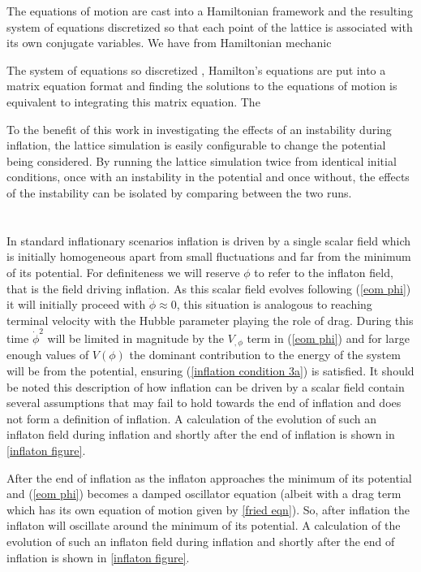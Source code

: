 \documentclass[letterpaper,11pt]{article}
\begin{document}
The equations of motion are cast into a Hamiltonian framework and the resulting system of equations discretized so that each point of the lattice is associated with its own conjugate variables. We have from Hamiltonian mechanic

The system of equations so discretized , Hamilton's equations are put into a matrix equation format and finding the solutions to the equations of motion is equivalent to integrating this matrix equation. The 

To the benefit of this work in investigating the effects of an instability during inflation, the lattice simulation is easily configurable to change the potential being considered. By running the lattice simulation twice from identical initial conditions, once with an instability in the potential and once without, the effects of the instability can be isolated by comparing between the two runs.

\section{}
In standard inflationary scenarios inflation is driven by a single scalar field which is initially homogeneous apart from small fluctuations and far from the minimum of its potential. %
For definiteness we will reserve $\phi$ to refer to the inflaton field, that is the field driving inflation.
As this scalar field evolves following (\ref{eom phi}) it will initially proceed with $\ddot{\phi} \approx 0$, this situation is analogous to reaching terminal velocity with the Hubble parameter playing the role of drag.%
 During this time $\dot{\phi}^2$ will be limited in magnitude by the $V_{,\phi}$ term in (\ref{eom phi}) and for large enough values of $V(\phi)$ the dominant contribution to the energy of the system will be from the potential, ensuring (\ref{inflation condition 3a}) is satisfied. It should be noted this description of how inflation can be driven by a scalar field contain several assumptions that may fail to hold towards the end of inflation and does not form a definition of inflation. A calculation of the evolution of such an inflaton field during inflation and shortly after the end of inflation is shown in \ref{inflaton figure}.

After the end of inflation as the inflaton approaches the minimum of its potential and (\ref{eom phi}) becomes a damped oscillator equation (albeit with a drag term which has its own equation of motion given by \ref{fried eqn}). So, after inflation the inflaton will oscillate around the minimum of its potential. A calculation of the evolution of such an inflaton field during inflation and shortly after the end of inflation is shown in \ref{inflaton figure}.
\end{document}
